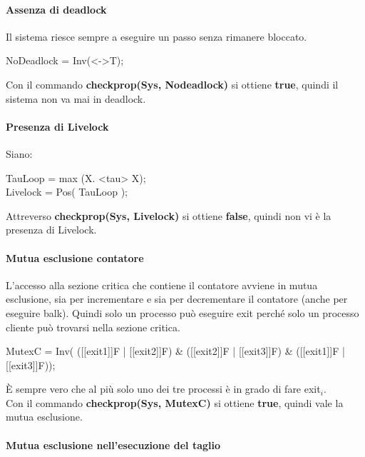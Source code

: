 \paragraph{Assenza di deadlock}\mbox{}

Il sistema riesce sempre a eseguire un passo senza rimanere bloccato.

\begin{center}
	\textsf{NoDeadlock = Inv(<->T);}
\end{center}

Con il commando \textbf{checkprop(Sys, Nodeadlock)} si ottiene \textbf{true}, quindi il sistema non va mai in deadlock.

\paragraph{Presenza di Livelock}\mbox{}

Siano:

\begin{center}
	\textsf{TauLoop = max (X. <tau> X);}\\
	\textsf{Livelock = Pos( TauLoop );}
\end{center}

Attreverso \textbf{checkprop(Sys, Livelock)} si ottiene \textbf{false}, quindi non vi è la presenza di Livelock.

\paragraph{Mutua esclusione contatore}\mbox{}

L'accesso alla sezione critica che contiene il contatore avviene in mutua esclusione, sia per incrementare e sia per decrementare il contatore (anche per eseguire \textsf{balk}). Quindi solo un processo può eseguire \textsf{exit} perché solo un processo cliente può trovarsi nella sezione critica.

\begin{center}
	\textsf{MutexC = Inv(
	([[exit1]]F | [[exit2]]F) \& 
 ([[exit2]]F | [[exit3]]F) \&
([[exit1]]F | [[exit3]]F));}
\end{center}

È sempre vero che al più solo uno dei tre processi è in grado di fare \textsf{exit$_{i}$}.\\
Con il commando \textbf{checkprop(Sys, MutexC)} si ottiene \textbf{true}, quindi vale la mutua esclusione.

\paragraph{Mutua esclusione nell'esecuzione del taglio}\mbox{}

